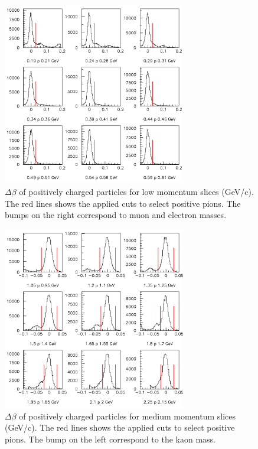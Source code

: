 \documentclass[12pt]{article}
\begin{document}
\begin{figure}[tbp]
\centering
\includegraphics[width=8cm] {answer-fig/TofProfile1.png} 
\caption {$\Delta \beta$ of positively charged particles for low momentum slices 
(GeV/c). The red lines shows the applied cuts to select positive pions. The bumps on the right
correspond to muon and electron masses.}
\label{TOF-1}
\end{figure}

\begin{figure}[tbp]
\centering
\includegraphics[width=8cm] {answer-fig/TofProfile2.png} 
\caption {$\Delta \beta$ of positively charged particles for medium momentum slices 
(GeV/c). The red lines shows the applied cuts to select positive pions. The bump on the left
correspond to the kaon mass.}
\label{TOF-2}
\end{figure}
\end{document}
